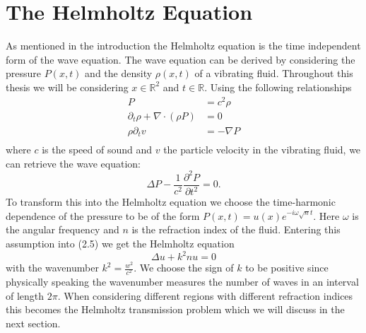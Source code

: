 \documentclass[a4paper, oneside]{discothesis}
\begin{document}
\section{The Helmholtz Equation}
As mentioned in the introduction the Helmholtz equation is the time independent form of the wave equation. 
The wave equation can be derived by considering the pressure $P(x,t)$ and the density $\rho(x,t)$ of a vibrating fluid.
Throughout this thesis we will be considering $x \in \mathbb{R}^2$ and $t \in \mathbb{R}$.
Using the following relationships
\begin{align}
	P &= c^2 \rho \\
	\partial_t \rho + \nabla \cdot (\rho P) &= 0 \\
	\rho \partial_t v &= -\nabla P \\
\end{align}
where $c$ is the speed of sound and $v$ the particle velocity in the vibrating fluid,
we can retrieve the wave equation:
\begin{equation}
	\Delta P - \frac{1}{c^2} \frac{\partial^2 P}{\partial t^2} = 0 .
\end{equation}
To transform this into the Helmholtz equation we choose the time-harmonic dependence of the pressure to be of the form $P(x,t) = u(x)e^{-i\omega \sqrt{n} t}$. 
Here $\omega$ is the angular frequency and $n$ is the refraction index of the fluid.
Entering this assumption into (2.5) we get the Helmholtz equation 
\begin{equation}
	\Delta u + k^2nu = 0
\end{equation}
with the wavenumber $k^2=\frac{w^2}{c^2}$. 
We choose the sign of $k$ to be positive since physically speaking the wavenumber measures the number of waves in an interval of length $2\pi$.
When considering different regions with different refraction indices this becomes the Helmholtz transmission problem which we will discuss in the next section.
\end{document}
